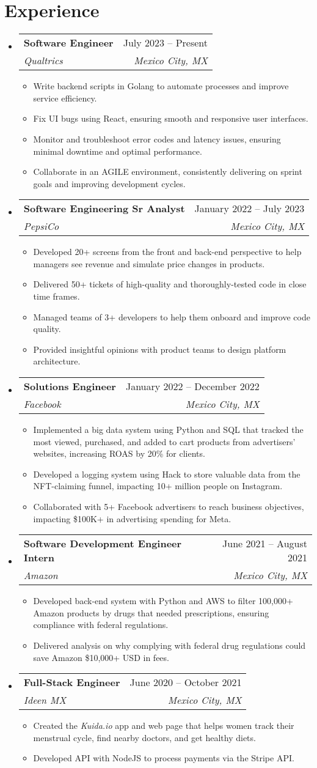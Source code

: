 \documentclass[letterpaper,11pt]{article}
\makeatletter
\newcommand{\resumeItem}[1]{
  \item\small{
    {#1 \vspace{-2pt}}
  }
}
\newcommand{\resumeSubheading}[4]{
  \vspace{-2pt}\item
    \begin{tabular*}{0.97\textwidth}[t]{l@{\extracolsep{\fill}}r}
      \textbf{#1} & #2 \\
      \textit{\small#3} & \textit{\small #4} \\
    \end{tabular*}\vspace{-7pt}
}
\newcommand{\resumeSubHeadingListStart}{\begin{itemize}[leftmargin=0.15in, label={}]}
\newcommand{\resumeSubHeadingListEnd}{\end{itemize}}
\newcommand{\resumeItemListStart}{\begin{itemize}}
\newcommand{\resumeItemListEnd}{\end{itemize}\vspace{-5pt}}
\makeatother
\begin{document}
\section{Experience}
  \resumeSubHeadingListStart
    \resumeSubheading
      {Software Engineer}{July 2023 -- Present}
      {Qualtrics}{Mexico City, MX}
      \resumeItemListStart
        \resumeItem{Write backend scripts in Golang to automate processes and improve service efficiency.}
        \resumeItem{Fix UI bugs using React, ensuring smooth and responsive user interfaces.}
        \resumeItem{Monitor and troubleshoot error codes and latency issues, ensuring minimal downtime and optimal performance.}
        \resumeItem{Collaborate in an AGILE environment, consistently delivering on sprint goals and improving development cycles.}
      \resumeItemListEnd
    \resumeSubheading
      {Software Engineering Sr Analyst}{January 2022 -- July 2023}
      {PepsiCo}{Mexico City, MX}
      \resumeItemListStart
        \resumeItem{Developed 20+ screens from the front and back-end perspective to help managers see revenue and simulate price changes in products.}
        \resumeItem{Delivered 50+ tickets of high-quality and thoroughly-tested code in close time frames.}
        \resumeItem{Managed teams of 3+ developers to help them onboard and improve code quality.}
        \resumeItem{Provided insightful opinions with product teams to design platform architecture.}
      \resumeItemListEnd
    \resumeSubheading
      {Solutions Engineer}{January 2022 -- December 2022}
      {Facebook}{Mexico City, MX}
      \resumeItemListStart
        \resumeItem{Implemented a big data system using Python and SQL that tracked the most viewed, purchased, and added to cart products from advertisers' websites, increasing ROAS by 20\% for clients.}
        \resumeItem{Developed a logging system using Hack to store valuable data from the NFT-claiming funnel, impacting 10+ million people on Instagram.}
        \resumeItem{Collaborated with 5+ Facebook advertisers to reach business objectives, impacting \$100K+ in advertising spending for Meta.}
      \resumeItemListEnd
    \resumeSubheading
      {Software Development Engineer Intern}{June 2021 -- August 2021}
      {Amazon}{Mexico City, MX}
      \resumeItemListStart
        \resumeItem{Developed back-end system with Python and AWS to filter 100,000+ Amazon products by drugs that needed prescriptions, ensuring compliance with federal regulations.}
        \resumeItem{Delivered analysis on why complying with federal drug regulations could save Amazon \$10,000+ USD in fees.}
      \resumeItemListEnd
    \resumeSubheading
      {Full-Stack Engineer}{June 2020 -- October 2021}
      {Ideen MX}{Mexico City, MX}
      \resumeItemListStart
        \resumeItem{Created the \emph{Kuida.io} app and web page that helps women track their menstrual cycle, find nearby doctors, and get healthy diets.}
        \resumeItem{Developed API with NodeJS to process payments via the Stripe API.}
      \resumeItemListEnd
  \resumeSubHeadingListEnd
\end{document}
